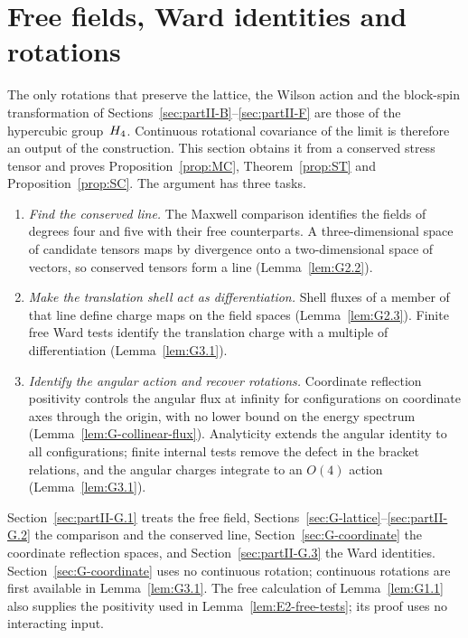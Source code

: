 \section{Free fields, Ward identities and rotations}\label{sec:partII-G}

The only rotations that preserve the lattice, the Wilson action and the block-spin transformation of Sections~\ref{sec:partII-B}--\ref{sec:partII-F} are those of the hypercubic group~$H_4$. Continuous rotational covariance of the limit is therefore an output of the construction. This section obtains it from a conserved stress tensor and proves Proposition~\ref{prop:MC}, Theorem~\ref{prop:ST} and Proposition~\ref{prop:SC}. The argument has three tasks.
\begin{enumerate}[label=(\arabic*)]
\item \emph{Find the conserved line.} The Maxwell comparison identifies the fields of degrees four and five with their free counterparts. A three-dimensional space of candidate tensors maps by divergence onto a two-dimensional space of vectors, so conserved tensors form a line (Lemma~\ref{lem:G2.2}).
\item \emph{Make the translation shell act as differentiation.} Shell fluxes of a member of that line define charge maps on the field spaces (Lemma~\ref{lem:G2.3}). Finite free Ward tests identify the translation charge with a multiple of differentiation (Lemma~\ref{lem:G3.1}).
\item \emph{Identify the angular action and recover rotations.} Coordinate reflection positivity controls the angular flux at infinity for configurations on coordinate axes through the origin, with no lower bound on the energy spectrum (Lemma~\ref{lem:G-collinear-flux}). Analyticity extends the angular identity to all configurations; finite internal tests remove the defect in the bracket relations, and the angular charges integrate to an $O(4)$ action (Lemma~\ref{lem:G3.1}).
\end{enumerate}
Section~\ref{sec:partII-G.1} treats the free field, Sections~\ref{sec:G-lattice}--\ref{sec:partII-G.2} the comparison and the conserved line, Section~\ref{sec:G-coordinate} the coordinate reflection spaces, and Section~\ref{sec:partII-G.3} the Ward identities. Section~\ref{sec:G-coordinate} uses no continuous rotation; continuous rotations are first available in Lemma~\ref{lem:G3.1}. The free calculation of Lemma~\ref{lem:G1.1} also supplies the positivity used in Lemma~\ref{lem:E2-free-tests}; its proof uses no interacting input.

